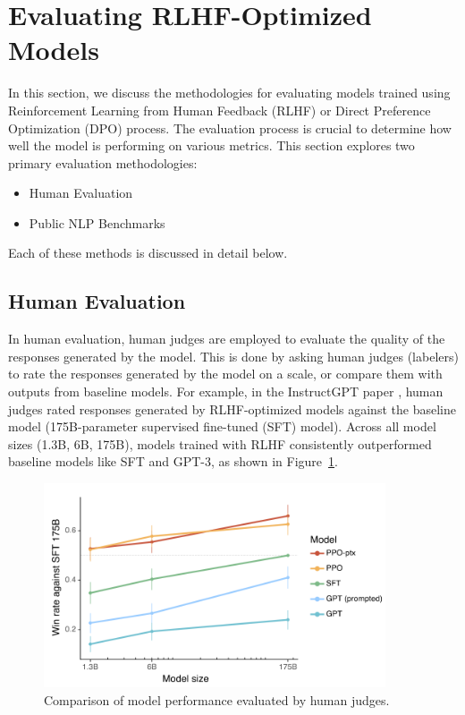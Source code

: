 \section{Evaluating RLHF-Optimized Models}
\label{sec:model-evaluation}

In this section, we discuss the methodologies for evaluating models trained using Reinforcement Learning from Human Feedback (RLHF) or Direct Preference Optimization (DPO) process. The evaluation process is crucial to determine how well the model is performing on various metrics. This section explores two primary evaluation methodologies:
\begin{itemize}
    \item Human Evaluation
    \item Public NLP Benchmarks
\end{itemize} 

Each of these methods is discussed in detail below.

\subsection{Human Evaluation}

In human evaluation, human judges are employed to evaluate the quality of the responses generated by the model. This is done by asking human judges (labelers) to rate the responses generated by the model on a scale, or compare them with outputs from baseline models. For example, in the InstructGPT paper \cite{ouyangTrainingLanguageModels2022}, human judges rated responses generated by RLHF-optimized models against the baseline model (175B-parameter supervised fine-tuned (SFT) model).
Across all model sizes (1.3B, 6B, 175B), models trained with RLHF consistently outperformed baseline models like SFT and GPT-3, as shown in Figure~\ref{fig:human-evaluation}.

\begin{figure}[h]
    \centering
    \includegraphics[width=0.9\textwidth]{figures/instructgptgraph.png}
    \caption{Comparison of model performance evaluated by human judges.}
    \label{fig:human-evaluation}
\end{figure}

